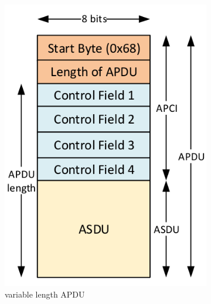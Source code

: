 \begin{figure}
\begin{subfigure}[b]{0.3\textwidth}
    \includegraphics[width=\textwidth]{obrazky-figures/apdu_variable_length.png}
    \caption{variable length APDU}
    \label{fig:variable_length_APDU}
  \end{subfigure}
  \hfill
  \begin{subfigure}[b]{0.3\textwidth}
    \centering

\end{subfigure}
\end{figure}
